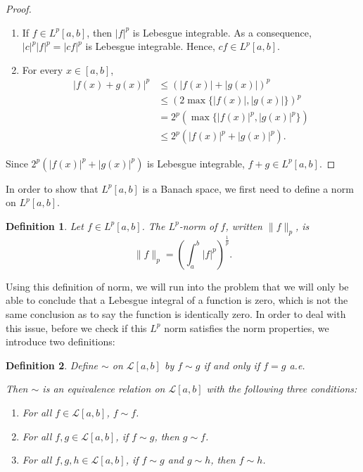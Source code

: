 \documentclass[12pt]{amsart}
\newtheorem{definition}{Definition}
\theoremstyle{plain}
\theoremstyle{definition}
\theoremstyle{remark}
\numberwithin{equation}{section}
\numberwithin{thm}{section}
\begin{document}
\begin{proof} 
\hfill
\begin{enumerate}
    \item[(i)] If $f \in L^p[a, b]$, then $|f|^p$ is Lebesgue integrable. As a consequence, $|c|^p|f|^p = |cf|^p$ is Lebesgue integrable. Hence, $cf \in L^p[a, b]$.
    
    \item [(ii)] For every $x \in [a, b]$,
    \begin{align*}
        |f(x) + g(x)|^p &\leq (|f(x)| + |g(x)|)^p \\
        &\leq (2 \max\{|f(x)|, |g(x)|\})^p \\
        & = 2^p \left(\max\{|f(x)|^p, |g(x)|^p\}\right) \\
        &\leq 2^p (|f(x)|^p + |g(x)|^p).
    \end{align*}
\end{enumerate}
    Since $2^p (|f(x)|^p + |g(x)|^p)$ is Lebesgue integrable, $f + g \in L^p[a, b]$.
\end{proof}


In order to show that $L^p[a,b]$ is a Banach space, we first need to define a norm on $L^p[a,b]$.
\begin{definition}
    Let $f \in L^p[a,b]$. The $L^p$-norm of $f$, written $\|f\|_p$, is
    \[
    \|f\|_p = (\int_a^b|f|^p)^{\frac{1}{p}}.
    \]
\end{definition}

Using this definition of norm, we will run into the problem that we will only be able to conclude that a Lebesgue integral of a function is zero, which is not the same conclusion as to say the function is identically zero. 
In order to deal with this issue, before we check if this $L^p$ norm satisfies the norm properties, we introduce two definitions:
\begin{definition}
    Define $\sim$ on $\mathcal{L}[a, b]$ by 
    $f \sim g$ if and only if $f = g$ a.e.  

Then $\sim$ is an equivalence relation on $\mathcal{L}[a,b]$ with the following three conditions: 
\begin{enumerate}
  \item[(i)] For all $f \in \mathcal{L}[a, b]$, $f \sim f$.
  \item[(ii)] For all $f, g \in \mathcal{L}[a, b]$, if $f \sim g$, then $g \sim f$.
  \item[(iii)] For all $f, g, h \in \mathcal{L}[a, b]$, if $f \sim g$ and $g \sim h$, then $f \sim h$.
\end{enumerate}
\end{definition}
\end{document}
